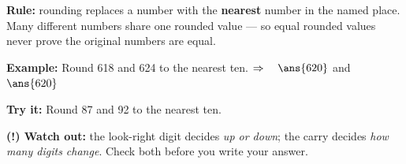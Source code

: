 \documentclass[12pt]{article}
\begin{document}
\begin{formulabox}
\textbf{Rule:} rounding replaces a number with the \textbf{nearest} number in
the named place. Many different numbers share one rounded value --- so equal
rounded values never prove the original numbers are equal.
\end{formulabox}

\begin{examplebox}
\textbf{Example:} \quad Round 618 and 624 to the nearest ten.
$\Rightarrow\quad \ans{620}$ and $\ans{620}$
\end{examplebox}

\begin{tryitbox}
\textbf{Try it:} \quad Round 87 and 92 to the nearest ten.\\[2pt]
\end{tryitbox}

\begin{watchoutbox}
\textbf{(!) Watch out:} the look-right digit decides \emph{up or down}; the
carry decides \emph{how many digits change}. Check both before you write your
answer.
\end{watchoutbox}
\end{document}
